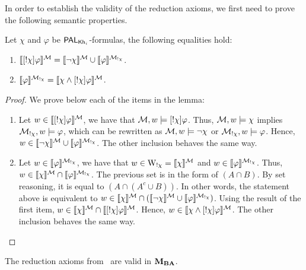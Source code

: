 \medskip 

In order to establish the validity of the reduction axioms, we first need to prove the following semantic properties.

\medskip 

\begin{lemma}\label{lem:palproperties} Let $\chi$ and $\varphi$ be $\mathsf{PAL}_{{\sf Kh}_i}$-formulas, the following equalities hold:
	\begin{enumerate}
	\item $\llbracket [!\chi]\varphi \rrbracket^{\mathcal{M}} = \llbracket \neg\chi \rrbracket^{\mathcal{M}} \cup \llbracket \varphi \rrbracket^{\mathcal{M}_{!\chi}}$.
	\item $\llbracket \varphi \rrbracket^{\mathcal{M}_{!\chi}} = \llbracket \chi \wedge [!\chi]\varphi \rrbracket^{\mathcal{M}}$.
	\end{enumerate}
	\end{lemma}
	
	\begin{proof}
	We prove below each of the items in the lemma:
	\begin{enumerate}
	\item Let $w \in \llbracket [!\chi]\varphi \rrbracket^{\mathcal{M}}$, we have that $\mathcal{M},w \models [!\chi]\varphi$. Thus, $\mathcal{M},w \models \chi$ implies $\mathcal{M}_{!\chi},w \models \varphi$, which can be rewritten as $\mathcal{M},w \models \neg\chi$ or $\mathcal{M}_{!\chi},w \models \varphi$. Hence, $w \in \llbracket \neg\chi \rrbracket^{\mathcal{M}} \cup \llbracket \varphi \rrbracket^{\mathcal{M}_{!\chi}}$. The other inclusion behaves the same way.
	\item Let $w \in \llbracket \varphi \rrbracket^{\mathcal{M}_{!\chi}}$, we have that $w \in \operatorname{W}_{!\chi} = \llbracket \chi \rrbracket^{\mathcal{M}}$ and $w \in \llbracket \varphi \rrbracket^{\mathcal{M}_{!\chi}}$. Thus, $w \in \llbracket \chi \rrbracket^{\mathcal{M}} \cap \llbracket \varphi \rrbracket^{\mathcal{M}_{!\chi}}$. The previous set is in the form of $(A \cap B)$. By set reasoning, it is equal to $(A \cap (A^c \cup B))$.
	In other words, the statement above is equivalent to $w \in \llbracket \chi \rrbracket^{\mathcal{M}} \cap (\llbracket \neg\chi \rrbracket^{\mathcal{M}} \cup \llbracket \varphi \rrbracket^{\mathcal{M}_{!\chi}})$. Using the result of the first item, $w \in \llbracket \chi \rrbracket^{\mathcal{M}} \cap \llbracket [!\chi]\varphi \rrbracket^{\mathcal{M}}$. Hence, $w \in \llbracket \chi \wedge [!\chi]\varphi \rrbracket^{\mathcal{M}}$.
	The other inclusion behaves the same way.
	\end{enumerate}
	\end{proof}

\begin{lemma}\label{lemma:palkh-valid}
	The reduction axioms from~ are valid in $\mathbf{M}_{\mathbf{BA}}$.
	\end{lemma}
	
